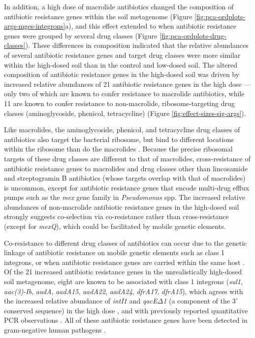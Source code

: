 In addition, a high dose of macrolide antibiotics changed the composition of antibiotic resistance genes within the soil metagenome (Figure \ref{fig:pca-ordplots-args-mges-integrons}a), and this effect extended to when antibiotic resistance genes were grouped by several drug classes (Figure \ref{fig:pca-ordplots-drug-classes}).
These differences in composition indicated that the relative abundances of several antibiotic resistance genes and target drug classes were more similar within the high-dosed soil than in the control and low-dosed soil.
The altered composition of antibiotic resistance genes in the high-dosed soil was driven by increased relative abundances of 21 antibiotic resistance genes in the high dose --- only two of which are known to confer resistance to macrolide antibiotics, while 11 are known to confer resistance to non-macrolide, ribosome-targeting drug classes (aminoglycoside, phenicol, tetracycline) (Figure \ref{fig:effect-sizes-sig-args}).

Like macrolides, the aminoglycoside, phenicol, and tetracycline drug classes of antibiotics also target the bacterial ribosome, but bind to different locations within the ribosome than do the macrolides \parencite{Pyorala.2014, Lohsen.2019}.
Because the precise ribosomal targets of these drug classes are different to that of macrolides, cross-resistance of antibiotic resistance genes to macrolides and drug classes other than lincosamide and streptogramin B antibiotics (whose targets overlap with that of macrolides) is uncommon, except for antibiotic resistance genes that encode multi-drug efflux pumps such as the \textit{mex} gene family in \textit{Pseudomonas} spp.
The increased relative abundances of non-macrolide antibiotic resistance genes in the high-dosed soil strongly suggests co-selection via co-resistance rather than cross-resistance
(except for \textit{mexQ}), which could be facilitated by mobile genetic elements.

Co-resistance to different drug classes of antibiotics can occur due to the genetic linkage of antibiotic resistance on mobile genetic elements such as class 1 integrons, or when antibiotic resistance genes are carried within the same host \parencite{Pal.2015}.
Of the 21 increased antibiotic resistance genes in the unrealistically high-dosed soil metagenome, eight are known to be associated with class 1 integrons (\textit{sul1}, \textit{aac(3)-Ib}, \textit{aadA}, \textit{aadA15}, \textit{aadA22}, \textit{aadA24}, \textit{dfrA17}, \textit{dfrA15}), which agrees with the increased relative abundance of \textit{intI1} and \textit{qacE$\Delta$1} (a component of the 3' conserved sequence) in the high dose \parencite{Partridge.2009, Yan.2006, Herrero.2008}, and with previously reported quantitative PCR observations \parencite{Lau.2020}.
All of these antibiotic resistance genes have been detected in gram-negative human pathogens \parencite{Alcock.2020}.

